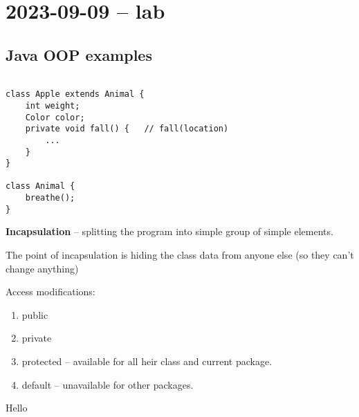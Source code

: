 \section{2023-09-09 -- lab}
\subsection{Java OOP examples}

\begin{verbatim}

class Apple extends Animal {
	int weight;
	Color color;
	private void fall() {	// fall(location)
		...
	}
}

class Animal {
	breathe();
}
\end{verbatim}


\textbf{Incapsulation} -- splitting the program into simple group of simple elements.

The point of incapsulation is hiding the class data from anyone else (so they can't change anything)

Access modifications:

\begin{enumerate}
	\item public
	\item private
	\item protected -- available for all heir class and current package.
	\item default -- unavailable for other packages.
\end{enumerate}

Hello
